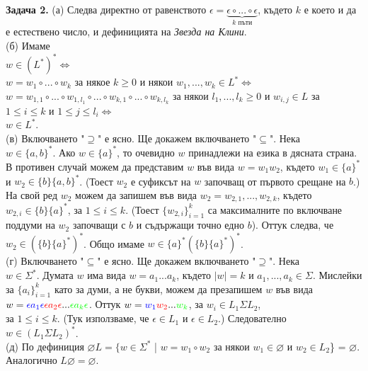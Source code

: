 \documentclass[openany]{book}
\begin{document}
    \textbf{Задача 2.} (а) Следва директно от равенството $\epsilon = \underbrace{\epsilon \circ ... \circ \epsilon}_\text{$k$ пъти}$, където $k$ е което и да е естествено число,
    и дефиницията на \textit{Звезда на Клини}. \\
    (б) Имаме \\
    $w \in (L^*)^* \iff$ \\ 
    $w = w_1 \circ ... \circ w_k$ за някое $k \geq 0$ и някои  $w_1,...,w_k \in L^* \iff$ \\
    $w = w_{1,1} \circ...\circ w_{1,l_1} \circ...\circ w_{k,1} \circ...\circ w_{k,l_k}$ за някои $l_1,...,l_k \geq 0$ и $w_{i,j} \in L$ за $1 \leq i \leq k$ и $1 \leq j \leq l_i \iff$ \\
    $w \in L^*$. \\
    (в) Включването "$\supseteq$" е ясно. Ще докажем включването "$\subseteq$". Нека \\ $w \in \{a,b\}^*$. Ако $w \in \{a\}^*$, то очевидно $w$ принадлежи на езика в дясната страна. В противен случай можем да 
    представим $w$ във вида $w = w_1w_2$, където $w_1 \in \{a\}^*$ и $w_2 \in \{b\}\{a,b\}^*$. (Тоест $w_2$ е суфиксът на $w$ започващ от първото срещане на $b$.) 
    На свой ред $w_2$ можем да запишем във вида $w_2 = w_{2,1},...,w_{2,k}$, където $w_{2,i} \in \{b\}\{a\}^*$, за $1 \leq i \leq k$.
    (Тоест $\{w_{2,i}\}_{i=1}^k$ са максималните по включване поддуми на $w_2$ започващи с $b$ и съдържащи точно едно $b$). Оттук следва, че $w_2 \in (\{b\}\{a\}^*)^*$. Общо имаме
    $w \in \{a\}^*(\{b\}\{a\}^*)^*$. \\
    (г) Включването "$\subseteq$" е ясно. Ще докажем включването "$\supseteq$". Нека \\$w \in \Sigma^*$. Думата $w$ има вида
    $w = a_1...a_k$, където $|w| = k$ и $a_1,...,a_k \in \Sigma$. Мислейки за $\{a_i\}_{i=1}^k$ като за думи, а не букви, можем да презапишем $w$ във вида $w = \textcolor{blue}{\epsilon a_1 \epsilon} \textcolor{red}{\epsilon a_2 \epsilon}... \textcolor{green}{\epsilon a_k \epsilon}$.
    Оттук $w = \textcolor{blue}{w_1}\textcolor{red}{w_2}...\textcolor{green}{w_k}$, за $w_i \in L_1 \Sigma L_2$, \\ за $1 \leq i \leq k$. (Тук използваме, че $\epsilon \in L_1$ и $\epsilon \in L_2$.)
    Следователно \\ $w \in (L_1 \Sigma L_2)^*$. \\
   (д) По дефиниция $\varnothing L = \{w \in \Sigma^*$ | $w = w_1 \circ w_2$ за някои $w_1 \in \varnothing$ и $w_2 \in L_2$\} = $\varnothing$.
   Аналогично $L \varnothing = \varnothing$. 
\end{document}
